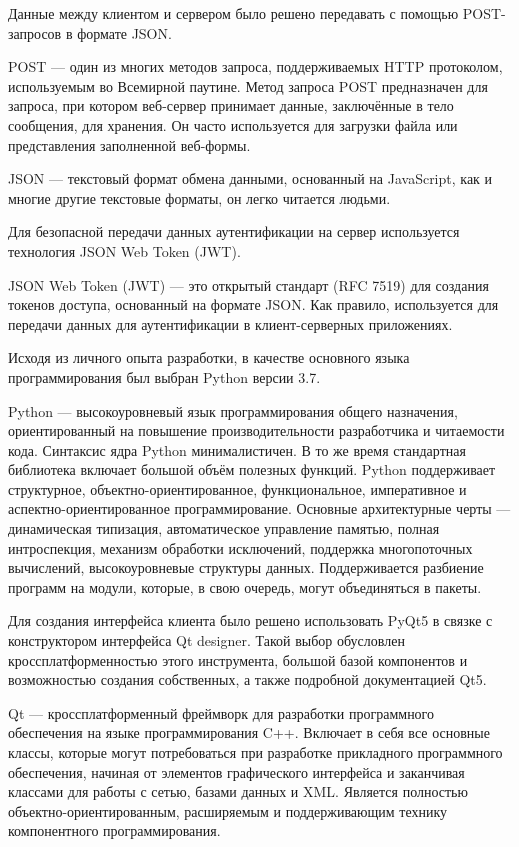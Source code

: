 Данные между клиентом и сервером было решено передавать с помощью POST-запросов в формате JSON.
\begin{definition}
    POST --- один из многих методов запроса, поддерживаемых HTTP протоколом, используемым во Всемирной паутине.
    Метод запроса POST предназначен для запроса, при котором веб-сервер принимает данные, заключённые в тело сообщения, для хранения.
    Он часто используется для загрузки файла или представления заполненной веб-формы.
\end{definition}

\begin{definition}
    JSON --- текстовый формат обмена данными, основанный на JavaScript, как и многие другие текстовые форматы, он легко читается людьми.
\end{definition}

Для безопасной передачи данных аутентификации на сервер используется технология JSON Web Token (JWT).
\begin{definition}
    JSON Web Token (JWT) --- это открытый стандарт (RFC 7519) для создания токенов доступа, основанный на формате JSON.
    Как правило, используется для передачи данных для аутентификации в клиент-серверных приложениях.
\end{definition}

Исходя из личного опыта разработки, в качестве основного языка программирования был выбран Python версии 3.7.
\begin{definition}
    Python --- высокоуровневый язык программирования общего назначения, ориентированный на повышение производительности разработчика и читаемости кода.
    Синтаксис ядра Python минималистичен. В то же время стандартная библиотека включает большой объём полезных функций.
    Python поддерживает структурное, объектно-ориентированное, функциональное, императивное и аспектно-ориентированное программирование.
    Основные архитектурные черты --- динамическая типизация, автоматическое управление памятью, полная интроспекция, механизм обработки исключений,
    поддержка многопоточных вычислений, высокоуровневые структуры данных. Поддерживается разбиение программ на модули, которые, в свою очередь,
    могут объединяться в пакеты.
\end{definition}

Для создания интерфейса клиента было решено использовать PyQt5 в связке с конструктором интерфейса Qt designer.
Такой выбор обусловлен кроссплатформенностью этого инструмента, большой базой компонентов и возможностью создания собственных,
а также подробной документацией Qt5.
\begin{definition}
    Qt  --- кроссплатформенный фреймворк для разработки программного обеспечения на языке программирования C++.
    Включает в себя все основные классы, которые могут потребоваться при разработке прикладного программного обеспечения,
    начиная от элементов графического интерфейса и заканчивая классами для работы с сетью, базами данных и XML.
    Является полностью объектно-ориентированным, расширяемым и поддерживающим технику компонентного программирования.
\end{definition}

